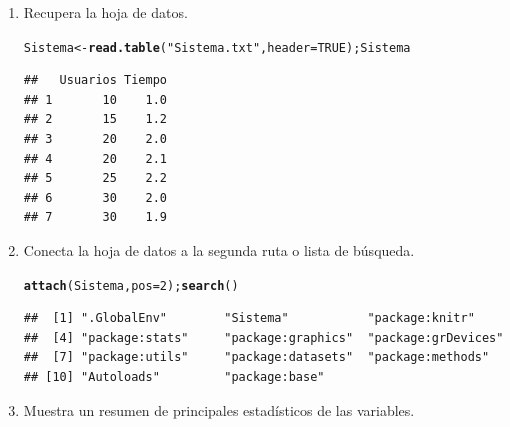 \documentclass[12pt,letterpaper]{article}\usepackage[]{graphicx}\usepackage[]{color}
\makeatletter
\newcommand{\hlnum}[1]{\textcolor[rgb]{0.686,0.059,0.569}{#1}}%
\newcommand{\hlstr}[1]{\textcolor[rgb]{0.192,0.494,0.8}{#1}}%
\newcommand{\hlstd}[1]{\textcolor[rgb]{0.345,0.345,0.345}{#1}}%
\newcommand{\hlkwb}[1]{\textcolor[rgb]{0.69,0.353,0.396}{#1}}%
\newcommand{\hlkwc}[1]{\textcolor[rgb]{0.333,0.667,0.333}{#1}}%
\newcommand{\hlkwd}[1]{\textcolor[rgb]{0.737,0.353,0.396}{\textbf{#1}}}%
\newenvironment{kframe}{%
 \def\at@end@of@kframe{}%
 \ifinner\ifhmode%
  \def\at@end@of@kframe{\end{minipage}}%
  \begin{minipage}{\columnwidth}%
 \fi\fi%
 \def\FrameCommand##1{\hskip\@totalleftmargin \hskip-\fboxsep
 \colorbox{shadecolor}{##1}\hskip-\fboxsep
     \hskip-\linewidth \hskip-\@totalleftmargin \hskip\columnwidth}%
 \MakeFramed {\advance\hsize-\width
   \@totalleftmargin\z@ \linewidth\hsize
   \@setminipage}}%
 {\par\unskip\endMakeFramed%
 \at@end@of@kframe}
\newenvironment{knitrout}{}{} %
\makeatother
\begin{document}
\begin{enumerate}
\item Recupera la hoja de datos. 
  
\begin{knitrout}
\color{fgcolor}\begin{kframe}
\begin{alltt}
\hlstd{Sistema} \hlkwb{<-} \hlkwd{read.table}\hlstd{(}\hlstr{"Sistema.txt"}\hlstd{,} \hlkwc{header}\hlstd{=}\hlnum{TRUE}\hlstd{); Sistema}
\end{alltt}
\begin{verbatim}
##   Usuarios Tiempo
## 1       10    1.0
## 2       15    1.2
## 3       20    2.0
## 4       20    2.1
## 5       25    2.2
## 6       30    2.0
## 7       30    1.9
\end{verbatim}
\end{kframe}
\end{knitrout}

\item Conecta la hoja de datos a la segunda ruta o lista de b\'usqueda.

\begin{knitrout}
\color{fgcolor}\begin{kframe}
\begin{alltt}
\hlkwd{attach}\hlstd{(Sistema,} \hlkwc{pos}\hlstd{=}\hlnum{2}\hlstd{);} \hlkwd{search}\hlstd{()}
\end{alltt}
\begin{verbatim}
##  [1] ".GlobalEnv"        "Sistema"           "package:knitr"    
##  [4] "package:stats"     "package:graphics"  "package:grDevices"
##  [7] "package:utils"     "package:datasets"  "package:methods"  
## [10] "Autoloads"         "package:base"
\end{verbatim}
\end{kframe}
\end{knitrout}

\item Muestra un resumen de principales estad\'isticos de las variables.


\end{enumerate}
\end{document}
